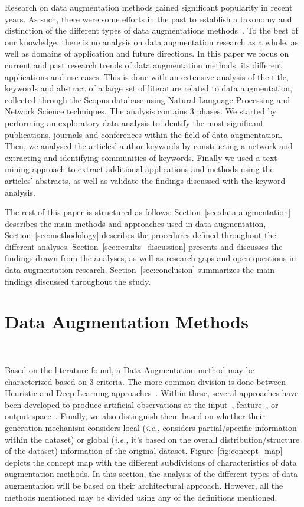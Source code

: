 \documentclass[pdflatex,sn-mathphys]{sn-jnl}%
\theoremstyle{thmstyleone}
\theoremstyle{thmstyletwo}
\theoremstyle{thmstylethree}
\begin{document}
Research on data augmentation methods gained significant popularity in recent
years. As such, there were some efforts in the past to establish a taxonomy
and distinction of the different types of data augmentations
methods~\cite{Shorten2019}. To the best of our knowledge, there is no analysis
on data augmentation research as a whole, as well as domains of application
and future directions. In this paper we focus on current and past research
trends of data augmentation methods, its different applications and use cases.
This is done with an extensive analysis of the title, keywords and abstract of
a large set of literature related to data augmentation, collected through the
\href{https://www.scopus.com/}{Scopus} database using Natural Language
Processing and Network Science techniques. The analysis contains 3 phases. We
started by performing an exploratory data analysis to identify the most
significant publications, journals and conferences within the field of data
augmentation. Then, we analysed the articles' author keywords by constructing
a network and extracting and identifying communities of keywords.  Finally we
used a text mining approach to extract additional applications and methods
using the articles' abstracts, as well as validate the findings discussed with
the keyword analysis.

The rest of this paper is structured as follows:
Section~\ref{sec:data-augmentation} describes the main methods and approaches
used in data augmentation, Section~\ref{sec:methodology} describes the
procedures defined throughout the different analyses.
Section~\ref{sec:results_discussion} presents and discusses the findings drawn
from the analyses, as well as research gaps and open questions in data
augmentation research. Section~\ref{sec:conclusion} summarizes the main
findings discussed throughout the study.

\section{Data Augmentation Methods}~\label{sec:data-augmentation}
 
Based on the literature found, a Data Augmentation method may be characterized
based on 3 criteria. The more common division is done between Heuristic and
Deep Learning approaches~\cite{Shorten2019}. Within these, several approaches
have been developed to produce artificial observations at the
input~\cite{Zhong2017}, feature~\cite{DeVries2017}, or output
space~\cite{Behpour2019}. Finally, we also distinguish them based on whether
their generation mechanism considers local (\textit{i.e.,} considers
partial/specific information within the dataset) or global (\textit{i.e.,}
it's based on the overall distribution/structure of the dataset) information
of the original dataset. Figure~\ref{fig:concept_map} depicts the concept map
with the different subdivisions of characteristics of data augmentation
methods. In this section, the analysis of the different types of data
augmentation will be based on their architectural approach. However, all the
methods mentioned may be divided using any of the definitions mentioned.
\end{document}
